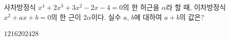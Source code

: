 사차방정식 $x^4+2x^3+3x^2-2x-4=0$의 한 허근을 $\alpha$라 할 때, 이차방정식 $x^2+ax+b=0$의 한 근이 $2\alpha$이다. 실수 $a$, $b$에 대하여 $a+b$의 값은?
\begin{choices32}{$12$}{$16$}{$20$}{$24$}{$28$}\end{choices32}
